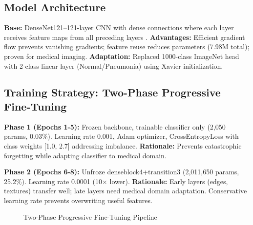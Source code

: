 \documentclass[12pt,a4paper]{article}
\begin{document}
\subsection{Model Architecture}
\textbf{Base:} DenseNet121--121-layer CNN with dense connections where each layer receives feature maps from all preceding layers \cite{huang2017}. \textbf{Advantages:} Efficient gradient flow prevents vanishing gradients; feature reuse reduces parameters (7.98M total); proven for medical imaging. \textbf{Adaptation:} Replaced 1000-class ImageNet head with 2-class linear layer (Normal/Pneumonia) using Xavier initialization.

\subsection{Training Strategy: Two-Phase Progressive Fine-Tuning}

\textbf{Phase 1 (Epochs 1-5):} Frozen backbone, trainable classifier only (2,050 params, 0.03\%). Learning rate 0.001, Adam optimizer, CrossEntropyLoss with class weights [1.0, 2.7] addressing imbalance. \textbf{Rationale:} Prevents catastrophic forgetting while adapting classifier to medical domain.

\textbf{Phase 2 (Epochs 6-8):} Unfroze denseblock4+transition3 (2,011,650 params, 25.2\%). Learning rate 0.0001 (10$\times$ lower). \textbf{Rationale:} Early layers (edges, textures) transfer well; late layers need medical domain adaptation. Conservative learning rate prevents overwriting useful features.

\begin{figure}[H]
\centering
\small
{}
\caption{Two-Phase Progressive Fine-Tuning Pipeline}
\label{fig:training}
\end{figure}
\end{document}
